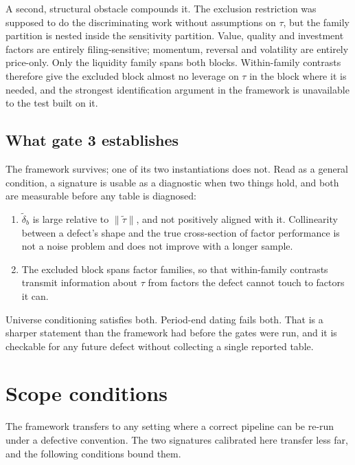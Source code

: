 \documentclass[11pt]{article}
\begin{document}
A second, structural obstacle compounds it. The exclusion restriction was supposed
to do the discriminating work without assumptions on $\tau$, but the family
partition is nested inside the sensitivity partition. Value, quality and investment
factors are entirely filing-sensitive; momentum, reversal and volatility are
entirely price-only. Only the liquidity family spans both blocks. Within-family
contrasts therefore give the excluded block almost no leverage on $\tau$ in the
block where it is needed, and the strongest identification argument in the
framework is unavailable to the test built on it.

\subsection{What gate 3 establishes}

The framework survives; one of its two instantiations does not. Read as a general
condition, a signature is usable as a diagnostic when two things hold, and both are
measurable before any table is diagnosed:

\begin{enumerate}
\item $\tilde{\delta}_b$ is large relative to $\lVert\tilde{\tau}\rVert$, and not
positively aligned with it. Collinearity between a defect's shape and the true
cross-section of factor performance is not a noise problem and does not improve
with a longer sample.
\item The excluded block spans factor families, so that within-family contrasts
transmit information about $\tau$ from factors the defect cannot touch to factors
it can.
\end{enumerate}

Universe conditioning satisfies both. Period-end dating fails both. That is a
sharper statement than the framework had before the gates were run, and it is
checkable for any future defect without collecting a single reported table.

\section{Scope conditions}
\label{sec:limits}

The framework transfers to any setting where a correct pipeline can be re-run under a
defective convention. The two signatures calibrated here transfer less far, and the
following conditions bound them.
\end{document}
